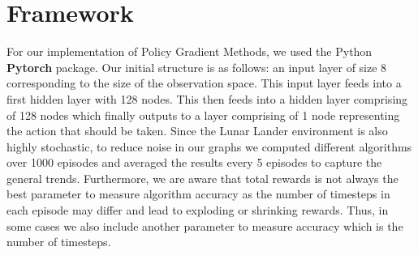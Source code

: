 \documentclass{article}
\begin{document}
\section{Framework}
For our implementation of Policy Gradient Methods, we used the Python \textbf{Pytorch} package. Our initial structure is as follows: an input layer of size 8 corresponding to the size of the observation space. This input layer feeds into a first hidden layer with 128 nodes. This then feeds into a hidden layer comprising of 128 nodes which finally outputs to a layer comprising of 1 node representing the action that should be taken. Since the Lunar Lander environment is also highly stochastic, to reduce noise in our graphs we computed different algorithms over 1000 episodes and averaged the results every 5 episodes to capture the general trends. Furthermore, we are aware that total rewards is not always the best parameter to measure algorithm accuracy as the number of timesteps in each episode may differ and lead to exploding or shrinking rewards. Thus, in some cases we also include another parameter to measure accuracy which is the number of timesteps.

\end{document}
